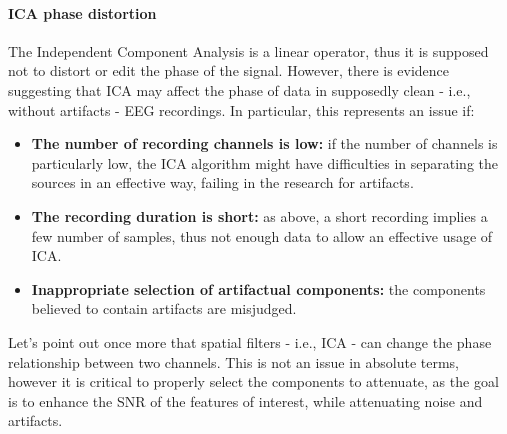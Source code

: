 \paragraph{ICA phase distortion} The Independent Component Analysis is a linear operator, thus
it is supposed not to distort or edit the phase of the signal. However, there is evidence
suggesting that ICA may affect the phase of data in supposedly clean - i.e., without artifacts -
EEG recordings. In particular, this represents an issue if:
\begin{itemize}
    \item \textbf{The number of recording channels is low:} if the number of channels is particularly
          low, the ICA algorithm might have difficulties in separating the
          sources in an effective way, failing in the research for artifacts.
    \item \textbf{The recording duration is short:} as above, a short recording implies a few number
          of samples, thus not enough data to allow an effective usage of ICA.
    \item \textbf{Inappropriate selection of artifactual components:} the components believed to
          contain artifacts are misjudged.
\end{itemize}
Let's point out once more that spatial filters - i.e., ICA - can change the phase relationship
between two channels. This is not an issue in absolute terms, however it is critical to
properly select the components to attenuate, as the goal is to enhance the SNR of the features
of interest, while attenuating noise and artifacts.
